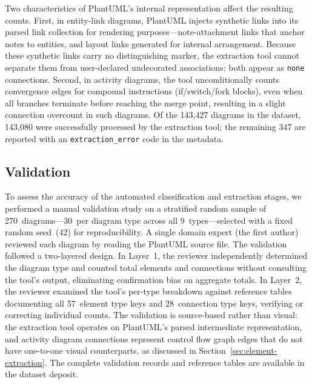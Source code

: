 \documentclass[11pt]{article}
\begin{document}
Two characteristics of PlantUML's internal representation affect the resulting counts. First, in entity-link diagrams, PlantUML injects synthetic links into its parsed link collection for rendering purposes---note-attachment links that anchor notes to entities, and layout links generated for internal arrangement. Because these synthetic links carry no distinguishing marker, the extraction tool cannot separate them from user-declared undecorated associations; both appear as \texttt{none} connections. Second, in activity diagrams, the tool unconditionally counts convergence edges for compound instructions (if/switch/fork blocks), even when all branches terminate before reaching the merge point, resulting in a slight connection overcount in such diagrams. Of the 143,427 diagrams in the dataset, 143,080 were successfully processed by the extraction tool; the remaining 347 are reported with an \texttt{extraction\_error} code in the metadata.

\subsection{Validation}
\label{sec:validation}

To assess the accuracy of the automated classification and extraction stages, we performed a manual validation study on a stratified random sample of 270~diagrams---30~per diagram type across all 9~types---selected with a fixed random seed~(42) for reproducibility. A single domain expert (the first author) reviewed each diagram by reading the PlantUML source file. The validation followed a two-layered design. In Layer~1, the reviewer independently determined the diagram type and counted total elements and connections without consulting the tool's output, eliminating confirmation bias on aggregate totals. In Layer~2, the reviewer examined the tool's per-type breakdown against reference tables documenting all 57~element type keys and 28~connection type keys, verifying or correcting individual counts. The validation is source-based rather than visual: the extraction tool operates on PlantUML's parsed intermediate representation, and activity diagram connections represent control flow graph edges that do not have one-to-one visual counterparts, as discussed in Section~\ref{sec:element-extraction}. The complete validation records and reference tables are available in the dataset deposit.
\end{document}
